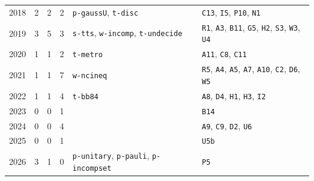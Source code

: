 \begin{longtable}{@{}lrrrp{3.4cm}p{5.6cm}@{}}
2018 & 2 & 2 & 2 & \texttt{p-gaussU}, \texttt{t-disc} & \texttt{C13}, \texttt{I5}, \texttt{P10}, \texttt{N1} \\
2019 & 3 & 5 & 3 & \texttt{s-tts}, \texttt{w-incomp}, \texttt{t-undecide} & \texttt{R1}, \texttt{A3}, \texttt{B11}, \texttt{G5}, \texttt{H2}, \texttt{S3}, \texttt{W3}, \texttt{U4} \\
2020 & 1 & 1 & 2 & \texttt{t-metro} & \texttt{A11}, \texttt{C8}, \texttt{C11} \\
2021 & 1 & 1 & 7 & \texttt{w-ncineq} & \texttt{R5}, \texttt{A4}, \texttt{A5}, \texttt{A7}, \texttt{A10}, \texttt{C2}, \texttt{D6}, \texttt{W5} \\
2022 & 1 & 1 & 4 & \texttt{t-bb84} & \texttt{A8}, \texttt{D4}, \texttt{H1}, \texttt{H3}, \texttt{I2} \\
2023 & 0 & 0 & 1 &  & \texttt{B14} \\
2024 & 0 & 0 & 4 &  & \texttt{A9}, \texttt{C9}, \texttt{D2}, \texttt{U6} \\
2025 & 0 & 0 & 1 &  & \texttt{U5b} \\
2026 & 3 & 1 & 0 & \texttt{p-unitary}, \texttt{p-pauli}, \texttt{p-incompset} & \texttt{P5} \\
\bottomrule\end{longtable}
